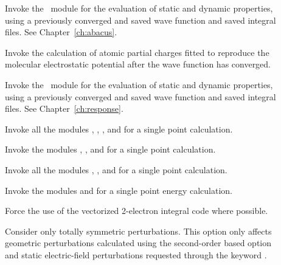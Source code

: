 \begin{description}
\item[] Invoke the \aba\ module for the evaluation of static
and dynamic properties, using a previously converged and saved wave function and saved integral files. See Chapter~\ref{ch:abacus}.

\item[] Invoke the calculation of atomic partial charges fitted to reproduce
the molecular electrostatic potential after the wave function has converged.

\item[]
Invoke the \resp\ module for the evaluation of static and dynamic
properties, using a previously converged and saved wave function and saved integral files. See Chapter~\ref{ch:response}.

\item[]
Invoke all the modules {\her}, {\sir}, {\resp}, and {\aba} for a single point calculation.

\item[]
Invoke the modules {\her}, {\sir}, and {\aba} for a single point calculation.

\item[]
Invoke all the modules {\her}, {\sir}, and {\resp} for a single point calculation.

\item[]
Invoke the modules {\her} and {\sir} for a single point energy calculation.


\item[] Force the use of the vectorized 2-electron integral code {\eri} where possible.



\item[] Consider only totally symmetric
perturbations.
This option only affects geometric perturbations calculated using the
second-order based  option and static
electric-field perturbations requested through the keyword .


\end{description}

